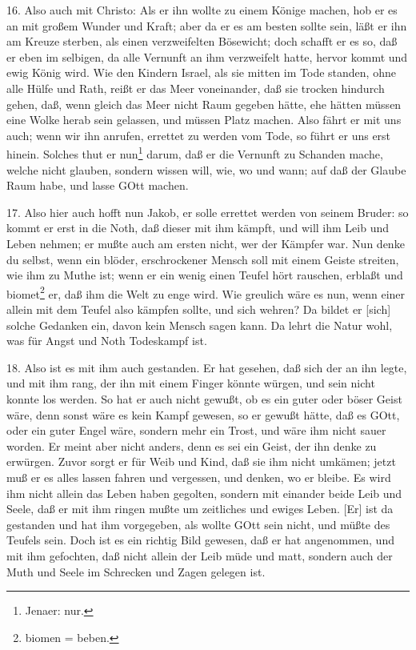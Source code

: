 16. Also auch mit Christo: Als er ihn wollte zu einem Könige machen, hob er es an mit großem Wunder und Kraft; aber da er es am besten sollte sein, läßt er ihn am Kreuze sterben, als einen verzweifelten Bösewicht; doch schafft er es so, daß er eben im selbigen, da alle Vernunft an ihm verzweifelt hatte, hervor kommt und ewig König wird. Wie den Kindern Israel, als sie mitten im Tode standen, ohne alle Hülfe und Rath, reißt er das Meer voneinander, daß sie trocken hindurch gehen, daß, wenn gleich das Meer nicht Raum gegeben hätte, ehe hätten müssen eine Wolke herab sein gelassen, und müssen Platz machen. Also fährt er mit uns auch; wenn wir ihn anrufen, errettet zu werden vom Tode, so führt er uns erst hinein. Solches thut er nun\footnote{Jenaer: nur.}
darum, daß er die Vernunft zu Schanden mache, welche nicht glauben, sondern wissen will, wie, wo und wann; auf daß der Glaube Raum habe, und lasse GOtt machen.

17. Also hier auch hofft nun Jakob, er solle errettet werden von seinem Bruder: so kommt er erst in die Noth, daß dieser mit ihm kämpft, und will ihm Leib und Leben nehmen; er mußte auch am ersten nicht, wer der Kämpfer war. Nun denke du selbst, wenn ein blöder, erschrockener Mensch soll mit einem Geiste streiten, wie ihm zu Muthe ist; wenn er ein wenig einen Teufel hört rauschen, erblaßt und biomet\footnote{biomen = beben.} er, daß ihm die Welt zu enge wird. Wie greulich wäre es nun, wenn einer allein mit dem Teufel also kämpfen sollte, und sich wehren? Da bildet er [sich] solche Gedanken ein, davon kein Mensch sagen kann. Da lehrt die Natur wohl, was für Angst und Noth Todeskampf ist.

18. Also ist es mit ihm auch gestanden. Er hat gesehen, daß sich der an ihn legte, und mit ihm rang, der ihn mit einem Finger könnte würgen, und sein nicht konnte los werden. So hat er auch nicht gewußt, ob es ein guter oder böser Geist wäre, denn sonst wäre es kein Kampf gewesen, so er gewußt hätte, daß es GOtt, oder ein guter Engel wäre, sondern mehr ein Trost, und wäre ihm nicht sauer worden. Er meint aber nicht anders, denn es sei ein Geist, der ihn denke zu erwürgen. Zuvor sorgt er für Weib und Kind, daß sie ihm nicht umkämen; jetzt muß er es alles lassen fahren und vergessen, und denken, wo er bleibe. Es wird ihm nicht allein das Leben haben gegolten, sondern mit einander beide Leib und Seele, daß er mit ihm ringen mußte um zeitliches und ewiges Leben. [Er] ist da gestanden und hat ihm vorgegeben, als wollte GOtt sein nicht, und müßte des Teufels sein. Doch ist es ein richtig Bild gewesen, daß er hat angenommen, und mit ihm gefochten, daß nicht allein der Leib müde und matt, sondern auch der Muth und Seele im Schrecken und Zagen gelegen ist.

